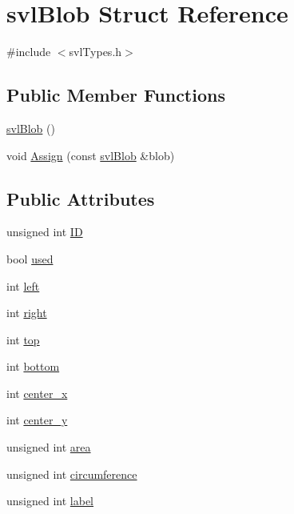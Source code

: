 \hypertarget{structsvl_blob}{\section{svl\-Blob Struct Reference}
\label{structsvl_blob}
}


{\ttfamily \#include $<$svl\-Types.\-h$>$}

\subsection*{Public Member Functions}
\begin{DoxyCompactItemize}
\item 
\hyperlink{structsvl_blob_aa5c85bcf7e5f81957753d25529fb75cc}{svl\-Blob} ()
\item 
void \hyperlink{structsvl_blob_a0c568061d55f208e487d49d7c6c91a9a}{Assign} (const \hyperlink{structsvl_blob}{svl\-Blob} \&blob)
\end{DoxyCompactItemize}
\subsection*{Public Attributes}
\begin{DoxyCompactItemize}
\item 
unsigned int \hyperlink{structsvl_blob_a5174e92930ddfc63cbf0f76c304277ed}{I\-D}
\item 
bool \hyperlink{structsvl_blob_a08ce50cc736dfb4bdcd8a14c4e4831a5}{used}
\item 
int \hyperlink{structsvl_blob_a1abceb138580922b5858370101e0ee81}{left}
\item 
int \hyperlink{structsvl_blob_a49a7d67d8af30cb95f4ff0cef20d8dde}{right}
\item 
int \hyperlink{structsvl_blob_a6f36e9987b39314c8d8e77070f5c4ae8}{top}
\item 
int \hyperlink{structsvl_blob_a536219faa643cda03590b3582964cae8}{bottom}
\item 
int \hyperlink{structsvl_blob_a13f6815c8e9adc6a23344281388a6297}{center\-\_\-x}
\item 
int \hyperlink{structsvl_blob_a8f827cd578843e0d8456d9e95f982988}{center\-\_\-y}
\item 
unsigned int \hyperlink{structsvl_blob_a7e72d5f683c384f0980f6d322630af74}{area}
\item 
unsigned int \hyperlink{structsvl_blob_a880846887397dd387770e6244a680513}{circumference}
\item 
unsigned int \hyperlink{structsvl_blob_a8c07b58d3ca8fa083d94f705c1b518c0}{label}
\end{DoxyCompactItemize}


